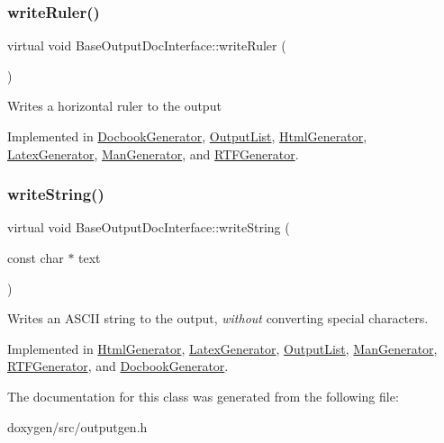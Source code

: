 \subsubsection{\texorpdfstring{writeRuler()}{writeRuler()}}
{\footnotesize\ttfamily virtual void Base\+Output\+Doc\+Interface\+::write\+Ruler (\begin{DoxyParamCaption}{ }\end{DoxyParamCaption})\hspace{0.3cm}{\ttfamily [pure virtual]}}

Writes a horizontal ruler to the output 

Implemented in \mbox{\hyperlink{class_docbook_generator_a69c4688a7f57b0cd7cc6eec70bf56e4d}{Docbook\+Generator}}, \mbox{\hyperlink{class_output_list_a2203589f0bc276cb3ba01f529b9536a9}{Output\+List}}, \mbox{\hyperlink{class_html_generator_aa8f5d1eab68eb5fd43f2529c947f0a02}{Html\+Generator}}, \mbox{\hyperlink{class_latex_generator_a3b87ba9aa190c6337db947023df1c0cc}{Latex\+Generator}}, \mbox{\hyperlink{class_man_generator_ab7a5373b1e631879e56bf5699e00cfe2}{Man\+Generator}}, and \mbox{\hyperlink{class_r_t_f_generator_a97d0c2260e0642d5b6ac0117b2e91687}{R\+T\+F\+Generator}}.

\mbox{\label{class_base_output_doc_interface_a5737513ddf260787b5b79c84ae1059af}} 
\subsubsection{\texorpdfstring{writeString()}{writeString()}}
{\footnotesize\ttfamily virtual void Base\+Output\+Doc\+Interface\+::write\+String (\begin{DoxyParamCaption}\item[{const char $\ast$}]{text }\end{DoxyParamCaption})\hspace{0.3cm}{\ttfamily [pure virtual]}}

Writes an A\+S\+C\+II string to the output, {\itshape without} converting special characters. 

Implemented in \mbox{\hyperlink{class_html_generator_ad54dd4f0dda0e22574149cfb4415ae4a}{Html\+Generator}}, \mbox{\hyperlink{class_latex_generator_a03cd5be16357940ab7d712791fc8949e}{Latex\+Generator}}, \mbox{\hyperlink{class_output_list_adeaf5f7b41eca22a3afbc415a8390767}{Output\+List}}, \mbox{\hyperlink{class_man_generator_a39ca2f1de2bbbe5548f6f03997a84c88}{Man\+Generator}}, \mbox{\hyperlink{class_r_t_f_generator_ace3fd5e7a703cbae0272372d7e55083b}{R\+T\+F\+Generator}}, and \mbox{\hyperlink{class_docbook_generator_a0435ece7899e4607115944383f2f1d77}{Docbook\+Generator}}.



The documentation for this class was generated from the following file\+:\begin{DoxyCompactItemize}
\item 
doxygen/src/outputgen.\+h\end{DoxyCompactItemize}
